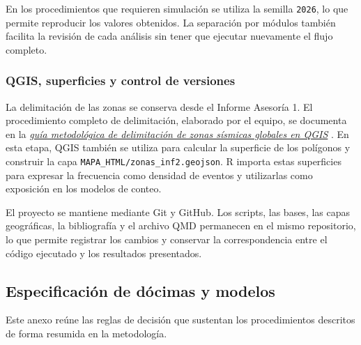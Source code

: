 \documentclass[
  spanish,
  letterpaper,
  DIV=11,
  numbers=noendperiod]{scrartcl}
\newcommand{\asesoriaExternalLink}[2]{%
  {\hypersetup{urlcolor=asesoriaLinkColor}\href{#1}{\textcolor{asesoriaLinkColor}{\emph{#2}}}}%
}
\begin{document}
En los procedimientos que requieren simulación se utiliza la semilla
\texttt{2026}, lo que permite reproducir los valores obtenidos. La
separación por módulos también facilita la revisión de cada análisis sin
tener que ejecutar nuevamente el flujo completo.

\subsubsection{QGIS, superficies y control de
versiones}\label{qgis-superficies-y-control-de-versiones}

La delimitación de las zonas se conserva desde el Informe Asesoría 1. El
procedimiento completo de delimitación, elaborado por el equipo, se
documenta en la
\asesoriaExternalLink{https://mariajosevn.github.io/USGS-earthquake-analysis/MAPA\_HTML/Gu\%C3\%ADa\%20metodol\%C3\%B3gica\%20para\%20la\%20delimitaci\%C3\%B3n\%20de\%20zonas\%20s\%C3\%ADsmicas\%20globales\%20en\%20QGIS.pdf}{guía metodológica de delimitación de zonas sísmicas globales en QGIS}.
En esta etapa, QGIS también se utiliza para calcular la superficie de
los polígonos y construir la capa
\texttt{MAPA\_HTML/zonas\_inf2.geojson}. R importa estas superficies
para expresar la frecuencia como densidad de eventos y utilizarlas como
exposición en los modelos de conteo.

El proyecto se mantiene mediante Git y GitHub. Los scripts, las bases,
las capas geográficas, la bibliografía y el archivo QMD permanecen en el
mismo repositorio, lo que permite registrar los cambios y conservar la
correspondencia entre el código ejecutado y los resultados presentados.

\newpage

\subsection{Especificación de dócimas y
modelos}\label{sec-anexo-especificacion}

Este anexo reúne las reglas de decisión que sustentan los procedimientos
descritos de forma resumida en la metodología.
\end{document}
